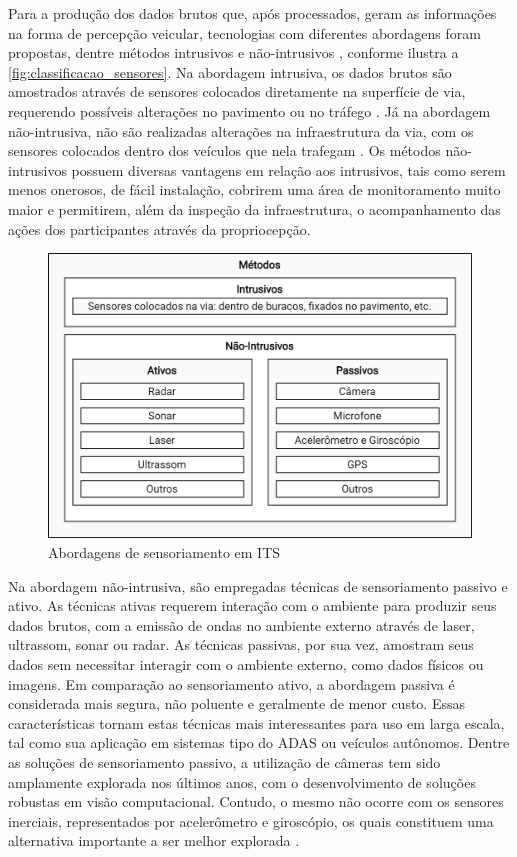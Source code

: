 Para a produção dos dados brutos que, após processados, geram as informações na forma de percepção veicular, tecnologias com diferentes abordagens foram propostas, dentre métodos intrusivos e não-intrusivos \cite{NI2016}, conforme ilustra a \autoref{fig:classificacao_sensores}. Na abordagem intrusiva, os dados brutos são amostrados através de sensores colocados diretamente na superfície de via, requerendo possíveis alterações no pavimento ou no tráfego \cite{mathew2014a}. Já na abordagem não-intrusiva, não são realizadas alterações na infraestrutura da via, com os sensores colocados dentro dos veículos que nela trafegam \cite{mathew2014b}. Os métodos não-intrusivos possuem diversas vantagens em relação aos intrusivos, tais como serem menos onerosos, de fácil instalação, cobrirem uma área de monitoramento muito maior e permitirem, além da inspeção da infraestrutura, o acompanhamento das ações dos participantes através da propriocepção.

\begin{figure}[h]
  \centering
  \caption{Abordagens de sensoriamento em ITS}
  \label{fig:classificacao_sensores}
  \includegraphics[width=0.9\linewidth]{figuras/fig_1.png}
\end{figure}

Na abordagem não-intrusiva, são empregadas técnicas de sensoriamento passivo e ativo. As técnicas ativas requerem interação com o ambiente para produzir seus dados brutos, com a emissão de ondas no ambiente externo através de laser, ultrassom, sonar ou radar. As técnicas passivas, por sua vez, amostram seus dados sem necessitar interagir com o ambiente externo, como dados físicos ou imagens. Em comparação ao sensoriamento ativo, a abordagem passiva é considerada mais segura, não poluente e geralmente de menor custo. Essas características tornam estas técnicas mais interessantes para uso em larga escala, tal como sua aplicação em sistemas tipo do ADAS ou veículos autônomos. Dentre as soluções de sensoriamento passivo, a utilização de câmeras tem sido amplamente explorada nos últimos anos, com o desenvolvimento de soluções robustas em visão computacional. Contudo, o mesmo não ocorre com os sensores inerciais, representados por acelerômetro e giroscópio, os quais constituem uma alternativa importante a ser melhor explorada \cite{menegazzo2018,menegazzo2020}.

